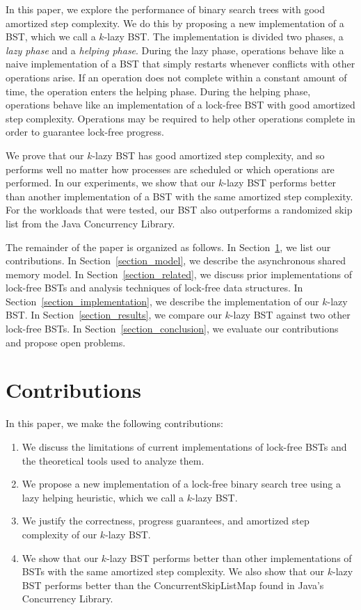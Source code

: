 \documentclass[letterpaper]{article}
\begin{document}
In this paper, we explore the performance of binary search trees with good amortized step complexity. We do this by proposing a new implementation of a BST, which we call a $k$-lazy BST. The implementation is divided two phases, a \textit{lazy phase} and a \textit{helping phase}. During the lazy phase, operations behave like a naive implementation of a BST that simply restarts whenever conflicts with other operations arise. If an operation does not complete within a constant amount of time, the operation enters the helping phase. During the helping phase, operations behave like an implementation of a lock-free BST with good amortized step complexity. Operations may be required to help other operations complete in order to guarantee lock-free progress. 

We prove that our $k$-lazy BST has good amortized step complexity, and so performs well no matter how processes are scheduled or which operations are performed. In our experiments, we show that our $k$-lazy BST performs better than another implementation of a BST with the same amortized step complexity. For the workloads that were tested, our BST also outperforms a randomized skip list from the Java Concurrency Library.

The remainder of the paper is organized as follows. In Section~\ref{section_contribution}, we list our contributions. In Section~\ref{section_model}, we describe the asynchronous shared memory model. In Section~\ref{section_related}, we discuss prior implementations of lock-free BSTs and analysis techniques of lock-free data structures. In Section~\ref{section_implementation}, we describe the implementation of our $k$-lazy BST. In Section~\ref{section_results}, we compare our $k$-lazy BST against two other lock-free BSTs. In Section~\ref{section_conclusion}, we evaluate our contributions and propose open problems.

\section{Contributions}\label{section_contribution}
In this paper, we make the following contributions:
\begin{enumerate}
	\item We discuss the limitations of current implementations of lock-free BSTs and the theoretical tools used to analyze them.
	\item We propose a new implementation of a lock-free binary search tree using a lazy helping heuristic, which we call a $k$-lazy BST. 
	\item We justify the correctness, progress guarantees, and amortized step complexity of our $k$-lazy BST.
	\item We show that our $k$-lazy BST performs better than other implementations of BSTs with the same amortized step complexity. We also show that our $k$-lazy BST performs better than the ConcurrentSkipListMap found in Java's Concurrency Library. 
\end{enumerate}
\end{document}
